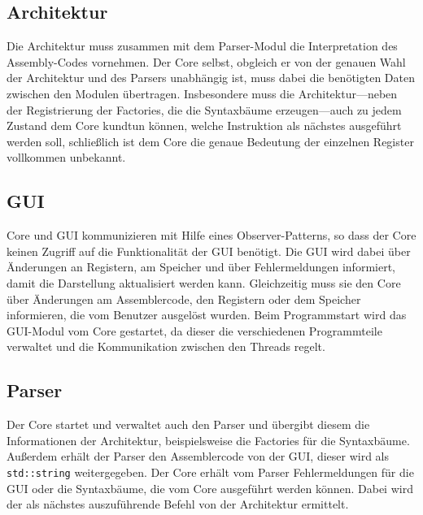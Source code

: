 \subsection{Architektur}
Die Architektur muss zusammen mit dem Parser-Modul die Interpretation des Assembly-Codes vornehmen. Der Core selbst, obgleich er von der genauen Wahl der Architektur und des Parsers unabhängig ist, muss dabei die benötigten Daten zwischen den Modulen übertragen. Insbesondere muss die Architektur---neben der Registrierung der Factories, die die Syntaxbäume erzeugen---auch zu jedem Zustand dem Core kundtun können, welche Instruktion als nächstes ausgeführt werden soll, schließlich ist dem Core die genaue Bedeutung der einzelnen Register vollkommen unbekannt.

\subsection{GUI}

Core und GUI kommunizieren mit Hilfe eines Observer-Patterns, so dass der Core keinen Zugriff auf die Funktionalität der GUI benötigt. Die GUI wird dabei über Änderungen an Registern, am Speicher und über Fehlermeldungen informiert, damit die Darstellung aktualisiert werden kann. Gleichzeitig muss sie den Core über Änderungen am Assemblercode, den Registern oder dem Speicher informieren, die vom Benutzer ausgelöst wurden. Beim Programmstart wird das GUI-Modul vom Core gestartet, da dieser die verschiedenen Programmteile verwaltet und die Kommunikation zwischen den Threads regelt.

\subsection{Parser}

Der Core startet und verwaltet auch den Parser und übergibt diesem die Informationen der Architektur, beispielsweise die Factories für die Syntaxbäume. Au{\ss}erdem erhält der Parser den Assemblercode von der GUI, dieser wird als \lstinline[style=C++]!std::string! weitergegeben. Der Core erhält vom Parser Fehlermeldungen für die GUI oder die Syntaxbäume, die vom Core ausgeführt werden können. Dabei wird der als nächstes auszuführende Befehl von der Architektur ermittelt.
